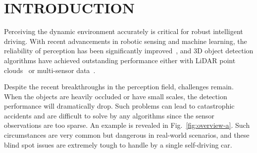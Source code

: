 \documentclass[letterpaper, 10 pt, conference]{ieeeconf}  %
\begin{document}
\section{INTRODUCTION}

Perceiving the dynamic environment accurately is critical for robust intelligent driving. With recent advancements in robotic sensing and machine learning, the reliability of perception has been significantly improved~\cite{liu2019auto, he2016deep, qi2017pointnet}, and 3D object detection algorithms have achieved outstanding performance either with LiDAR point clouds~\cite{voxelnet,pointpillar,Shi_2019_CVPR, Shi2020PVRCNNPF} or multi-sensor data~\cite{Liang2009, Liang2018}. 


Despite the recent breakthroughs in the perception field, challenges remain. When the objects are heavily occluded or have small scales, the detection performance will dramatically drop. Such problems can lead to catastrophic accidents and are difficult to solve by any algorithms since the sensor observations are too sparse. An example is revealed in Fig.~\ref{fig:overview-a}. Such circumstances are very common but dangerous in real-world scenarios, and these blind spot issues are extremely tough to handle by a single self-driving car. 
\end{document}
